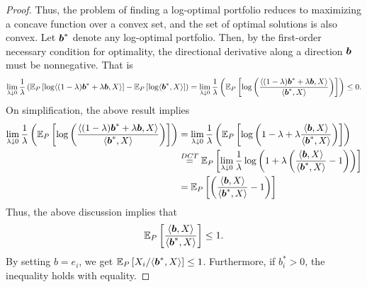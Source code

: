 \begin{proof}
        Thus, the problem of finding a log-optimal portfolio reduces to maximizing a concave function over a convex set, and the set of optimal solutions is also convex. Let $\boldsymbol{b}^*$ denote any log-optimal portfolio. Then, by the first-order necessary condition for optimality, the directional derivative along a direction $\boldsymbol{b}$ must be nonnegative. That is 
        \begin{align}
            \lim_{\lambda \downarrow 0} \frac{1}{\lambda} \left(  \mathbb{E}_P \left[ \log \langle (1-\lambda)\boldsymbol{b}^* + \lambda \boldsymbol{b}, X \rangle \right]  - \mathbb{E}_P \left[ \log \langle \boldsymbol{b}^*, X \rangle \right]  \right)  
            = \lim_{\lambda \downarrow 0} \frac{1}{\lambda} \left(  \mathbb{E}_P \left[ \log \left( \frac{ \langle (1-\lambda)\boldsymbol{b}^* + \lambda \boldsymbol{b}, X \rangle}{\langle \boldsymbol{b}^*, X \rangle} \right) \right]  \right) \leq 0. 
        \end{align}
        On simplification, the above result implies 
        \begin{align}
            \lim_{\lambda \downarrow 0} \frac{1}{\lambda} \left(  \mathbb{E}_P \left[ \log \left( \frac{ \langle (1-\lambda)\boldsymbol{b}^* + \lambda \boldsymbol{b}, X \rangle}{\langle \boldsymbol{b}^*, X \rangle} \right) \right]  \right)  &= 
            \lim_{\lambda \downarrow 0} \frac{1}{\lambda} \left(  \mathbb{E}_P \left[ \log \left( 1-\lambda +  \lambda \frac{ \langle \boldsymbol{b}, X \rangle}{\langle \boldsymbol{b}^*, X \rangle} \right) \right]  \right) \\
            &\stackrel{DCT}{=} 
                \mathbb{E}_P \left[ \lim_{\lambda \downarrow 0} \frac{1}{\lambda} \log \left( 1 +  \lambda \left(  \frac{ \langle \boldsymbol{b}, X \rangle}{\langle \boldsymbol{b}^*, X \rangle}-1\right) \right) \right]  \\
            & =   \mathbb{E}_P \left[  \left(  \frac{ \langle \boldsymbol{b}, X \rangle}{\langle \boldsymbol{b}^*, X \rangle}-1\right) \right] 
        \end{align}
        Thus, the above discussion implies that 
        \begin{align}
            \mathbb{E}_P \left[   \frac{ \langle \boldsymbol{b}, X \rangle}{\langle \boldsymbol{b}^*, X \rangle} \right]  \leq 1. 
        \end{align}
        By setting $b = e_i$, we get $\mathbb{E}_P\left[ X_i/\langle \boldsymbol{b}^*, X \rangle\right] \leq 1$. Furthermore, if $b_i^* > 0$, the inequality holds with equality. 
    \end{proof}

